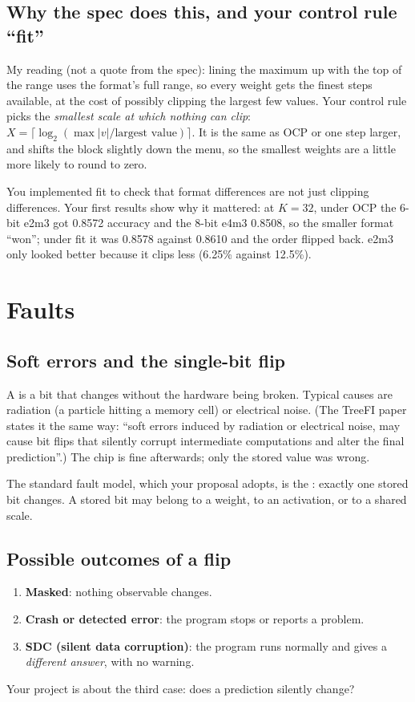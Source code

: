 \subsection{Why the spec does this, and your control rule ``fit''}
My reading (not a quote from the spec): lining the maximum up with the top of the range uses the format's full
range, so every weight gets the finest steps available, at the cost of possibly clipping the largest few values.
Your control rule  picks the \emph{smallest scale at which nothing can clip}:
$X=\lceil\log_2(\max|v|/\text{largest value})\rceil$. It is the same as OCP or one step larger, and shifts the block
slightly down the menu, so the smallest weights are a little more likely to round to zero.

You implemented fit to check that format differences are not just clipping differences. Your first results show
why it mattered: at $K=32$, under OCP the 6-bit e2m3 got 0.8572 accuracy and the 8-bit e4m3 0.8508, so the smaller
format ``won''; under fit it was 0.8578 against 0.8610 and the order flipped back. e2m3 only looked better because
it clips less (6.25\% against 12.5\%).

\section{Faults}

\subsection{Soft errors and the single-bit flip}
A  is a bit that changes without the hardware being broken. Typical causes are radiation
(a particle hitting a memory cell) or electrical noise. (The TreeFI paper states it the same way: ``soft errors
induced by radiation or electrical noise, may cause bit flips that silently corrupt intermediate computations
and alter the final prediction''.) The chip is fine afterwards; only the stored value was wrong.

The standard fault model, which your proposal adopts, is the : exactly one stored bit
changes. A stored bit may belong to a weight, to an activation, or to a shared scale.

\subsection{Possible outcomes of a flip}
\begin{enumerate}
\item \textbf{Masked}: nothing observable changes.
\item \textbf{Crash or detected error}: the program stops or reports a problem.
\item \textbf{SDC (silent data corruption)}: the program runs normally and gives a \emph{different answer}, with no warning.
\end{enumerate}
Your project is about the third case: does a prediction silently change?

